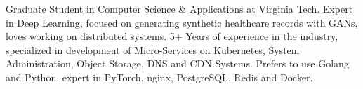 

\begin{cvparagraph}


Graduate Student in Computer Science \& Applications at Virginia Tech. Expert in Deep Learning, focused on generating synthetic healthcare records with GANs, loves working on distributed systems. 5+ Years of experience in the industry, specialized in development of Micro-Services on Kubernetes, System Administration, Object Storage, DNS and CDN Systems. Prefers to use Golang and Python, expert in PyTorch, nginx, PostgreSQL, Redis and Docker.

\end{cvparagraph}
